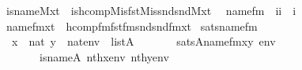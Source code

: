\begin{isabellebody}
\ \ {\isachardoublequoteopen}is{\isacharunderscore}{\kern0pt}name{}{\isacharparenleft}{\kern0pt}M{\isacharcomma}{\kern0pt}x{\isacharcomma}{\kern0pt}t{}{\isacharparenright}{\kern0pt}\ {\isasymequiv}\ is{\isacharunderscore}{\kern0pt}hcomp{\isacharparenleft}{\kern0pt}M{\isacharcomma}{\kern0pt}is{\isacharunderscore}{\kern0pt}fst{\isacharparenleft}{\kern0pt}M{\isacharparenright}{\kern0pt}{\isacharcomma}{\kern0pt}is{\isacharunderscore}{\kern0pt}snd{\isacharunderscore}{\kern0pt}snd{\isacharparenleft}{\kern0pt}M{\isacharparenright}{\kern0pt}{\isacharcomma}{\kern0pt}x{\isacharcomma}{\kern0pt}t{}{\isacharparenright}{\kern0pt}{\isachardoublequoteclose}\isanewline
\isanewline
{}\isamarkupfalse%
\isanewline
\ \ name{}{\isacharunderscore}{\kern0pt}fm\ {\isacharcolon}{\kern0pt}{\isacharcolon}{\kern0pt}\ {\isachardoublequoteopen}{\isacharbrackleft}{\kern0pt}i{\isacharcomma}{\kern0pt}i{\isacharbrackright}{\kern0pt}\ {\isasymRightarrow}\ i{\isachardoublequoteclose}\ \isanewline
\ \ {\isachardoublequoteopen}name{}{\isacharunderscore}{\kern0pt}fm{\isacharparenleft}{\kern0pt}x{\isacharcomma}{\kern0pt}t{}{\isacharparenright}{\kern0pt}\ {\isasymequiv}\ hcomp{\isacharunderscore}{\kern0pt}fm{\isacharparenleft}{\kern0pt}fst{\isacharunderscore}{\kern0pt}fm{\isacharcomma}{\kern0pt}snd{\isacharunderscore}{\kern0pt}snd{\isacharunderscore}{\kern0pt}fm{\isacharcomma}{\kern0pt}x{\isacharcomma}{\kern0pt}t{}{\isacharparenright}{\kern0pt}{\isachardoublequoteclose}\isanewline
\isanewline
{}\isamarkupfalse%
\ sats{\isacharunderscore}{\kern0pt}name{}{\isacharunderscore}{\kern0pt}fm\ {\isacharcolon}{\kern0pt}\isanewline
\ \ {\isachardoublequoteopen}{\isasymlbrakk}\ x\ {\isasymin}\ nat{\isacharsemicolon}{\kern0pt}\ y\ {\isasymin}\ nat{\isacharsemicolon}{\kern0pt}env\ {\isasymin}\ list{\isacharparenleft}{\kern0pt}A{\isacharparenright}{\kern0pt}\ {\isasymrbrakk}\ \isanewline
\ \ \ \ {\isasymLongrightarrow}\ sats{\isacharparenleft}{\kern0pt}A{\isacharcomma}{\kern0pt}name{}{\isacharunderscore}{\kern0pt}fm{\isacharparenleft}{\kern0pt}x{\isacharcomma}{\kern0pt}y{\isacharparenright}{\kern0pt}{\isacharcomma}{\kern0pt}\ env{\isacharparenright}{\kern0pt}\ {\isasymlongleftrightarrow}\isanewline
\ \ \ \ \ \ \ \ is{\isacharunderscore}{\kern0pt}name{}{\isacharparenleft}{\kern0pt}{\isacharhash}{\kern0pt}{\isacharhash}{\kern0pt}A{\isacharcomma}{\kern0pt}\ nth{\isacharparenleft}{\kern0pt}x{\isacharcomma}{\kern0pt}env{\isacharparenright}{\kern0pt}{\isacharcomma}{\kern0pt}\ nth{\isacharparenleft}{\kern0pt}y{\isacharcomma}{\kern0pt}env{\isacharparenright}{\kern0pt}{\isacharparenright}{\kern0pt}{\isachardoublequoteclose}\isanewline

\end{isabellebody}
